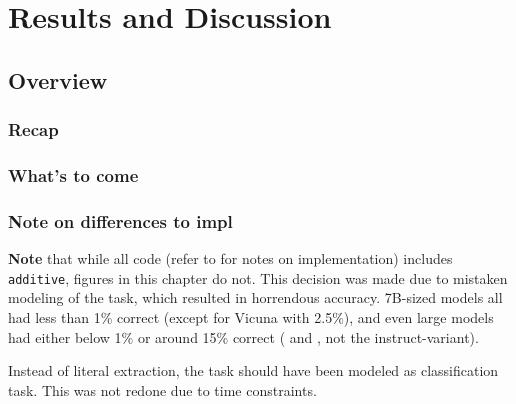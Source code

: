\chapter{Results and Discussion}\label{chap:results}
\section{Overview}\label{sec:res:overview}
\subsection{Recap}

\subsection{What's to come}

\subsection{Note on differences to impl}
\textbf{Note} that while all code (refer to  for notes on implementation) includes \texttt{additive}, figures in this chapter do not.
This decision was made due to mistaken modeling of the task, which resulted in horrendous accuracy.
7B-sized models all had less than 1\% correct (except for Vicuna with 2.5\%), and even large models had either below 1\% or around 15\% correct ( and , not the instruct-variant).

Instead of literal extraction, the task should have been modeled as classification task.
This was not redone due to time constraints.








